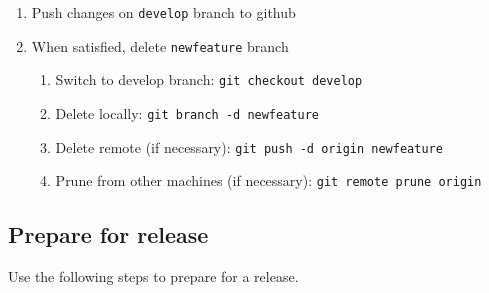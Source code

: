 \documentclass{article}
\begin{document}
\begin{enumerate}
  \item Push changes on \texttt{develop} branch to github
  \item When satisfied, delete \texttt{newfeature} branch
  \begin{enumerate}

    \item Switch to develop branch: \texttt{git checkout develop}

    \item Delete locally: \texttt{git branch -d newfeature}

    \item Delete remote (if necessary): \texttt{git push -d origin newfeature} 
	
	\item Prune from other machines (if necessary): \texttt{git remote prune origin} 

  \end{enumerate}
\end{enumerate}


\subsection{Prepare for release} 
\label{sec:prep-for-release}

Use the following steps to prepare for a release.
\end{document}
